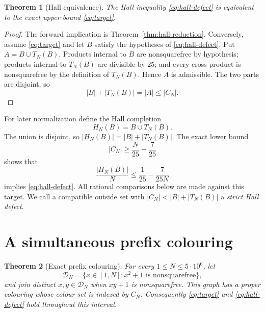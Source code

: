 \documentclass[11pt]{article}
\newtheorem{theorem}{Theorem}[section]
\theoremstyle{definition}
\newcommand{\CN}{C_N}
\newcommand{\TN}{T_N}
\newcommand{\FiveMillion}{5\cdot10^6}
\begin{document}
\begin{theorem}[Hall equivalence]\label{thm:hall-equivalence}
The Hall inequality \eqref{eq:hall-defect} is equivalent to the exact
upper bound \eqref{eq:target}.
\end{theorem}

\begin{proof}
The forward implication is Theorem~\ref{thm:hall-reduction}.  Conversely,
assume \eqref{eq:target} and let $B$ satisfy the hypotheses of
\eqref{eq:hall-defect}.  Put $A=B\cup\TN(B)$.  Products internal to $B$ are
nonsquarefree by hypothesis; products internal to $\TN(B)$ are divisible by
$25$; and every cross-product is nonsquarefree by the definition of
$\TN(B)$.  Hence $A$ is admissible.  The two parts are disjoint, so
\[
 |B|+|\TN(B)|=|A|\leq|\CN|.
\]
\end{proof}

For later normalization define the Hall completion
\[
  H_N(B)=B\cup\TN(B).
\]
The union is disjoint, so $|H_N(B)|=|B|+|\TN(B)|$.  The exact lower bound
\begin{equation}\label{eq:normalized-target}
  |\CN|\geq \frac N{25}-\frac7{25}
\end{equation}
shows that
\[
 \frac{|H_N(B)|}{N}\leq \frac1{25}-\frac7{25N}
\]
implies \eqref{eq:hall-defect}.  All rational comparisons below are made
against this target.
We call a compatible outside set with
$|\CN|<|B|+|\TN(B)|$ a \emph{strict Hall defect}.

\section{A simultaneous prefix colouring}

\begin{theorem}[Exact prefix colouring]
\label{thm:finite-prefix-colouring-close}
For every $1\leq N\leq\FiveMillion$, let
\[
 \mathcal D_N=\{x\in[1,N]:x^2+1\text{ is nonsquarefree}\},
\]
and join distinct $x,y\in\mathcal D_N$ when $xy+1$ is nonsquarefree.
This graph has a proper colouring whose colour set is indexed by $\CN$.
Consequently \eqref{eq:target} and \eqref{eq:hall-defect} hold throughout
this interval.
\end{theorem}
\end{document}
